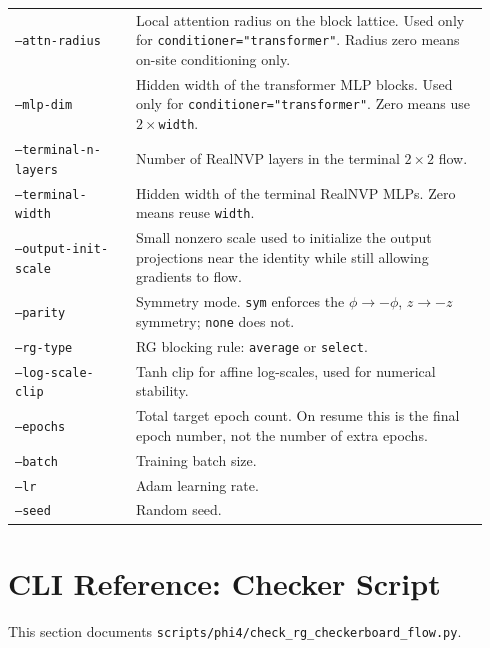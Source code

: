 \documentclass[11pt]{article}
\begin{document}
\begin{longtable}{p{0.24\linewidth}p{0.70\linewidth}}
\texttt{--attn-radius} & Local attention radius on the block lattice. Used only for \texttt{conditioner="transformer"}. Radius zero means on-site conditioning only. \\
\texttt{--mlp-dim} & Hidden width of the transformer MLP blocks. Used only for \texttt{conditioner="transformer"}. Zero means use $2\times$\texttt{width}. \\
\texttt{--terminal-n-layers} & Number of RealNVP layers in the terminal $2\times 2$ flow. \\
\texttt{--terminal-width} & Hidden width of the terminal RealNVP MLPs. Zero means reuse \texttt{width}. \\
\texttt{--output-init-scale} & Small nonzero scale used to initialize the output projections near the identity while still allowing gradients to flow. \\
\texttt{--parity} & Symmetry mode. \texttt{sym} enforces the $\phi\to-\phi$, $z\to-z$ symmetry; \texttt{none} does not. \\
\texttt{--rg-type} & RG blocking rule: \texttt{average} or \texttt{select}. \\
\texttt{--log-scale-clip} & Tanh clip for affine log-scales, used for numerical stability. \\
\texttt{--epochs} & Total target epoch count. On resume this is the final epoch number, not the number of extra epochs. \\
\texttt{--batch} & Training batch size. \\
\texttt{--lr} & Adam learning rate. \\
\texttt{--seed} & Random seed. \\
\bottomrule
\end{longtable}

\section{CLI Reference: Checker Script}

This section documents
\texttt{scripts/phi4/check\_rg\_checkerboard\_flow.py}.
\end{document}
